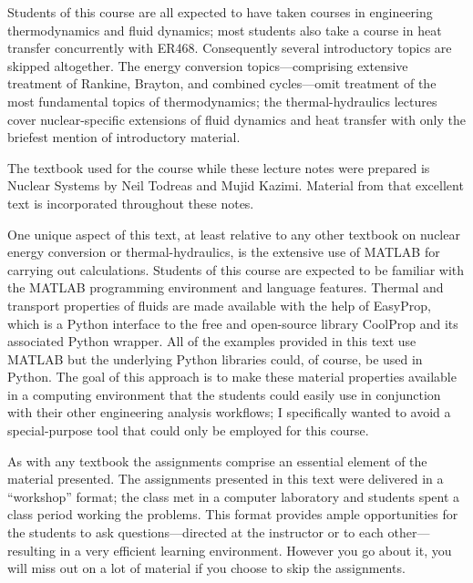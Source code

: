 \documentclass{tufte-book}
\begin{document}
Students of this course are all expected to have taken courses in engineering thermodynamics and fluid dynamics; most students also take a course in heat transfer concurrently with ER468.  Consequently several introductory topics are skipped altogether.  The energy conversion topics---comprising extensive treatment of Rankine, Brayton, and combined cycles---omit treatment of the most fundamental topics of thermodynamics; the thermal-hydraulics lectures cover nuclear-specific extensions of fluid dynamics and heat transfer with only the briefest mention of introductory material.

The textbook used for the course while these lecture notes were prepared is Nuclear Systems by Neil Todreas and Mujid Kazimi.\cite{todreasNS}  Material from that excellent text is incorporated throughout these notes.

One unique aspect of this text, at least relative to any other textbook on nuclear energy conversion or thermal-hydraulics, is the extensive use of MATLAB\cite{matlab} for carrying out calculations.  Students of this course are expected to be familiar with the MATLAB programming environment and language features.  Thermal and transport properties of fluids are made available with the help of EasyProp,\cite{easyprop} which is a Python interface to the free and open-source library CoolProp and its associated Python wrapper.\cite{coolprop_wrapper} All of the examples provided in this  text use MATLAB but the underlying Python libraries could, of course, be used in Python. The goal of this approach is to make these material properties available in a computing environment that the students could easily use in conjunction with their other engineering analysis workflows; I specifically wanted to avoid a special-purpose tool that could only be employed for this course.  

As with any textbook the assignments comprise an essential element of the material presented.  The assignments presented in this text were delivered in a ``workshop'' format; the class met in a computer laboratory and students spent a class period working the problems.  This format provides ample opportunities for the students to ask questions---directed at the instructor or to each other---resulting in a very efficient learning environment.  However you go about it, you will miss out on a lot of material if you choose to skip the assignments.



\mainmatter
\end{document}
